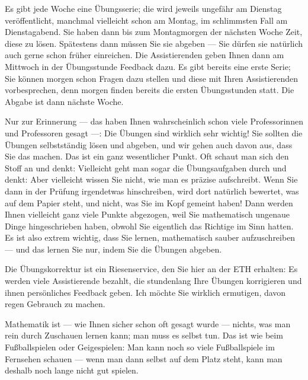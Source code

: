 \begin{spoken-clean}[00:07:08 - 00:09:43]
Es gibt jede Woche eine Übungsserie; die wird jeweils ungefähr am Dienstag veröffentlicht, manchmal vielleicht schon am Montag, im schlimmsten Fall am Dienstagabend. Sie haben dann bis zum Montagmorgen der nächsten Woche Zeit, diese zu lösen. Spätestens dann müssen Sie sie abgeben --- Sie dürfen sie natürlich auch gerne schon früher einreichen. Die Assistierenden geben Ihnen dann am Mittwoch in der Übungsstunde Feedback dazu. Es gibt bereits eine erste Serie; Sie können morgen schon Fragen dazu stellen und diese mit Ihren Assistierenden vorbesprechen, denn morgen finden bereits die ersten Übungsstunden statt. Die Abgabe ist dann nächste Woche.

Nur zur Erinnerung --- das haben Ihnen wahrscheinlich schon viele Professorinnen und Professoren gesagt ---: Die Übungen sind wirklich sehr wichtig! Sie sollten die Übungen selbstständig lösen und abgeben, und wir gehen auch davon aus, dass Sie das machen. Das ist ein ganz wesentlicher Punkt. Oft schaut man sich den Stoff an und denkt:  Vielleicht geht man sogar die Übungsaufgaben durch und denkt:  Aber vielleicht wissen Sie nicht, wie man es präzise aufschreibt. Wenn Sie dann in der Prüfung irgendetwas hinschreiben, wird dort natürlich bewertet, was auf dem Papier steht, und nicht, was Sie im Kopf gemeint haben! Dann werden Ihnen vielleicht ganz viele Punkte abgezogen, weil Sie mathematisch ungenaue Dinge hingeschrieben haben, obwohl Sie eigentlich das Richtige im Sinn hatten. Es ist also extrem wichtig, dass Sie lernen, mathematisch sauber aufzuschreiben --- und das lernen Sie nur, indem Sie die Übungen abgeben.

Die Übungskorrektur ist ein Riesenservice, den Sie hier an der ETH erhalten: Es werden viele Assistierende bezahlt, die stundenlang Ihre Übungen korrigieren und ihnen persönliches Feedback geben. Ich möchte Sie wirklich ermutigen, davon regen Gebrauch zu machen.

Mathematik ist --- wie Ihnen sicher schon oft gesagt wurde --- nichts, was man rein durch Zuschauen lernen kann; man muss es selbst tun. Das ist wie beim Fußballspielen oder Geigespielen: Man kann noch so viele Fußballspiele im Fernsehen schauen --- wenn man dann selbst auf dem Platz steht, kann man deshalb noch lange nicht gut spielen.


\end{spoken-clean}
